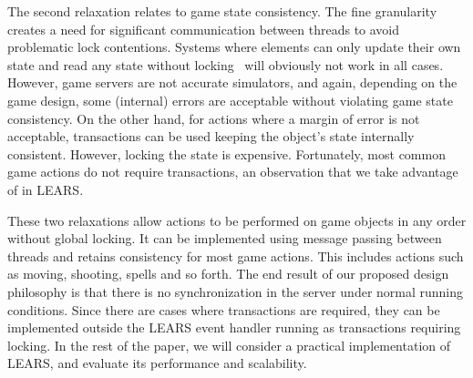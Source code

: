 The second relaxation relates to game state consistency. The fine
granularity creates a need for significant communication between threads
to avoid problematic lock contentions. Systems where
%
elements can only update their own state and read any state
without locking~\cite{Abdelkhalek2004++}
%
will obviously not work in all cases. However, game servers are not
accurate simulators, and again, depending on the game design, some
(internal) errors are acceptable without violating game state
consistency. 
%
On the other hand, for actions where a margin of error is not
acceptable, transactions can be used keeping the object's state
internally consistent. However, locking the state is
expensive. Fortunately, most common game actions do not require
transactions, an observation that we take advantage of in LEARS.

These two relaxations allow actions to be performed on game objects in
any order without global locking. It can be implemented using message
passing between threads and retains consistency for most game actions.
This includes actions such as moving, shooting, spells and so forth.
The end result of our proposed design philosophy is that there is no
synchronization in the server under normal running conditions. Since
there are cases where transactions are required, they can be implemented
outside the LEARS event handler running as transactions
requiring locking. In the rest of the paper, we will consider a
practical implementation of LEARS, and evaluate its performance and
scalability.
